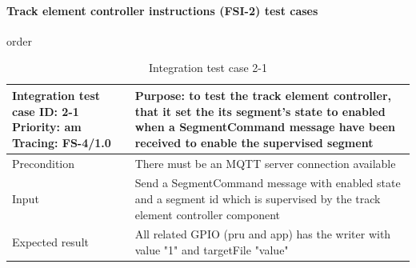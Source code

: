 \paragraph{Track element controller instructions (FSI-2) test cases} order
\begin{table}[H]
	\caption{Integration test case 2-1}
	\label{table:TCase-FSI2-1}
	\begin{center}
		\renewcommand{\arraystretch}{1.8}
		\begin{tabu} 
			to 0.9 \textwidth
			{  X[0.4, c] X[c] }
			\toprule
			Integration test case ID: 2-1 \newline Priority: am \newline Tracing: FS-4/1.0 & Purpose: to test the track element controller, that it set the its segment's state to enabled when a SegmentCommand message have been received to enable the supervised segment \\ \midrule
			Precondition                                                                   & There must be an MQTT server connection available                                                                                                                               \\
			Input                                                                          & Send a SegmentCommand message with enabled state and a segment id which is supervised by the track element controller component                                                 \\
			Expected result                                                                & All related GPIO (pru and app) has the writer with value "1" and targetFile "value"                                                                                             \\ \bottomrule
		\end{tabu}
	\end{center}
\end{table} 


